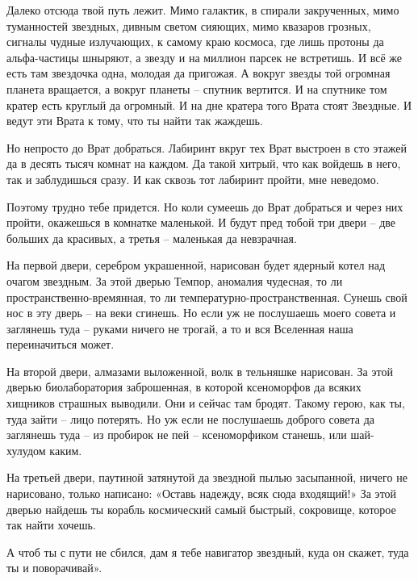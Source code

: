 \documentclass[ebook,oneside,final,openright]{memoir}
\begin{document}
\par
Далеко отсюда твой путь лежит. Мимо галактик, в спирали закрученных, мимо туманностей звездных, дивным светом сияющих, мимо квазаров грозных, сигналы чудные излучающих, к самому краю космоса, где лишь протоны да альфа-частицы шныряют, а звезду и на миллион парсек не встретишь. И всё же есть там звездочка одна, молодая да пригожая. А вокруг звезды той огромная планета вращается, а вокруг планеты – спутник вертится. И на спутнике том кратер есть круглый да огромный. И на дне кратера того Врата стоят Звездные. И ведут эти Врата к тому, что ты найти так жаждешь.\par
\par
Но непросто до Врат добраться. Лабиринт вкруг тех Врат выстроен в сто этажей да в десять тысяч комнат на каждом. Да такой хитрый, что как войдешь в него, так и заблудишься сразу. И как сквозь тот лабиринт пройти, мне неведомо.\par
\par
Поэтому трудно тебе придется. Но коли сумеешь до Врат добраться и через них пройти, окажешься в комнатке маленькой. И будут пред тобой три двери – две больших да красивых, а третья – маленькая да невзрачная.\par
\par
На первой двери, серебром украшенной, нарисован будет ядерный котел над очагом звездным. За этой дверью Темпор, аномалия чудесная, то ли пространственно-времянная, то ли температурно-пространственная. Сунешь свой нос в эту дверь – на веки сгинешь. Но если уж не послушаешь моего совета и заглянешь туда – руками ничего не трогай, а то и вся Вселенная наша переиначиться может.\par
\par
На второй двери, алмазами выложенной, волк в тельняшке нарисован. За этой дверью биолаборатория заброшенная, в которой ксеноморфов да всяких хищников страшных выводили. Они и сейчас там бродят. Такому герою, как ты, туда зайти – лицо потерять. Но уж если не послушаешь доброго совета да заглянешь туда – из пробирок не пей – ксеноморфиком станешь, или шай-хулудом каким.\par
\par
На третьей двери, паутиной затянутой да звездной пылью засыпанной, ничего не нарисовано, только написано: «Оставь надежду, всяк сюда входящий!» За этой дверью найдешь ты корабль космический самый быстрый, сокровище, которое так найти хочешь.\par
\par
А чтоб ты с пути не сбился, дам я тебе навигатор звездный, куда он скажет, туда ты и поворачивай».\par
\end{document}
